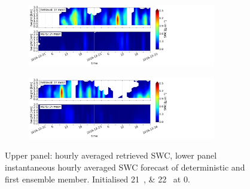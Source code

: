 \begin{figure}[ht!]%
	\centering
	\begin{subfigure}[t]{\textwidth}
		\centering
		\includegraphics[trim={0.cm 0.8cm 19.cm 0.5cm},clip,width=0.9\textwidth]{./fig_vert_SWC_1h/20161221}
		\caption{}\label{fig:SWC1h:21}
	\end{subfigure}
	\begin{subfigure}[t]{\textwidth}
		\centering
		\includegraphics[trim={0.cm 0.8cm 19.cm 0.5cm},clip,width=0.9\textwidth]{./fig_vert_SWC_1h/20161222}
		\caption{}\label{fig:SWC1h:22}
	\end{subfigure}
	\caption{Upper panel: hourly averaged retrieved SWC, lower panel instantaneous hourly averaged SWC forecast of deterministic and first ensemble member. Initialised \SIlist{21;22}{\dec} at \SI{0}{\UTC}. }\label{fig:SWC1h}
\end{figure}
